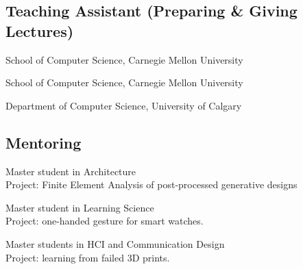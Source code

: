 \subsection{Teaching Assistant (Preparing \& Giving Lectures)}

 {
	 {
		School of Computer Science, Carnegie Mellon University
	}
}

 {
	 {
		School of Computer Science, Carnegie Mellon University
	}
}

 {
	 {
		Department of Computer Science, University of Calgary
	}
}


\subsection{Mentoring}
 {
	 {
		Master student in Architecture\\
		Project: Finite Element Analysis of post-processed generative designs
	}
}

 {
	 {
		Master student in Learning Science\\
		Project: one-handed gesture for smart watches.
	}
}

 {
	 {
		Master students in HCI and Communication Design\\
		Project: learning from failed 3D prints.
	}
}